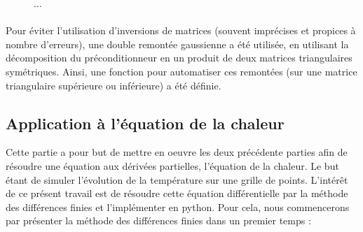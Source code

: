 \documentclass{article}
\begin{document}
\begin{figure}[h]
    \centering
    \caption{...}
    \label{fig:conj_precond}
\end{figure}

\paragraph{}
    Pour éviter l'utilisation d'inversions de matrices (souvent imprécises et propices à nombre d'erreurs), une double remontée gaussienne a été utilisée, en utilisant la décomposition du préconditionneur en un produit de deux matrices triangulaires symétriques. Ainsi, une fonction pour automatiser ces remontées (sur une matrice triangulaire supérieure ou inférieure) a été définie.
    
    
\subsection*{Application à l’équation de la chaleur}
    Cette partie a pour but de mettre en oeuvre les deux précédente parties afin de résoudre une équation aux dérivées partielles, l'équation de la chaleur. Le but étant de simuler l'évolution de la température sur une grille de points. 
    L’intérêt de ce présent travail est de résoudre cette équation différentielle par la méthode des différences finies et l’implémenter en python.
    Pour cela, nous commencerons par présenter la méthode des différences finies dans un
    premier temps : 
\end{document}
